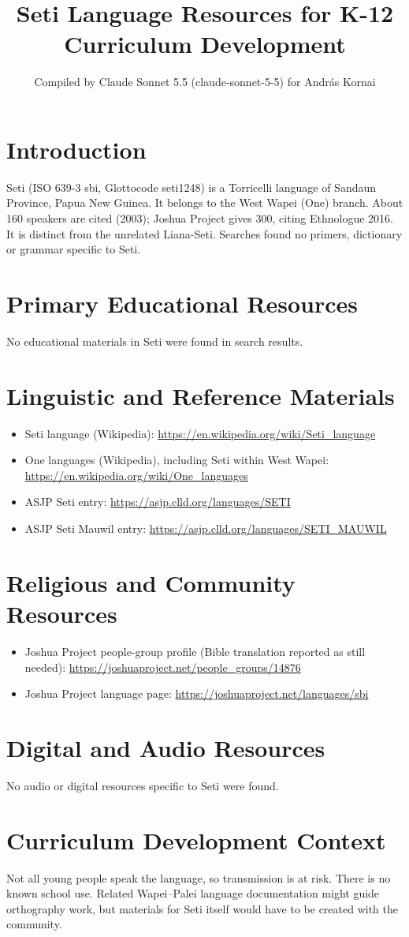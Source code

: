 \documentclass[12pt]{article}
\title{Seti Language Resources for K-12 Curriculum Development}
\author{Compiled by Claude Sonnet 5.5 (claude-sonnet-5-5) for Andr\'as Kornai}
\date{}
\begin{document}
\maketitle

\section{Introduction}
Seti (ISO 639-3 sbi, Glottocode seti1248) is a Torricelli language of Sandaun Province, Papua New Guinea. It belongs to the West Wapei (One) branch. About 160 speakers are cited (2003); Joshua Project gives 300, citing Ethnologue 2016. It is distinct from the unrelated Liana-Seti. Searches found no primers, dictionary or grammar specific to Seti.

\section{Primary Educational Resources}
No educational materials in Seti were found in search results.

\section{Linguistic and Reference Materials}
\begin{itemize}
\item Seti language (Wikipedia): \url{https://en.wikipedia.org/wiki/Seti_language}
\item One languages (Wikipedia), including Seti within West Wapei: \url{https://en.wikipedia.org/wiki/One_languages}
\item ASJP Seti entry: \url{https://asjp.clld.org/languages/SETI}
\item ASJP Seti Mauwil entry: \url{https://asjp.clld.org/languages/SETI_MAUWIL}
\end{itemize}

\section{Religious and Community Resources}
\begin{itemize}
\item Joshua Project people-group profile (Bible translation reported as still needed): \url{https://joshuaproject.net/people_groups/14876}
\item Joshua Project language page: \url{https://joshuaproject.net/languages/sbi}
\end{itemize}

\section{Digital and Audio Resources}
No audio or digital resources specific to Seti were found.

\section{Curriculum Development Context}
Not all young people speak the language, so transmission is at risk. There is no known school use. Related Wapei--Palei language documentation might guide orthography work, but materials for Seti itself would have to be created with the community.
\end{document}
